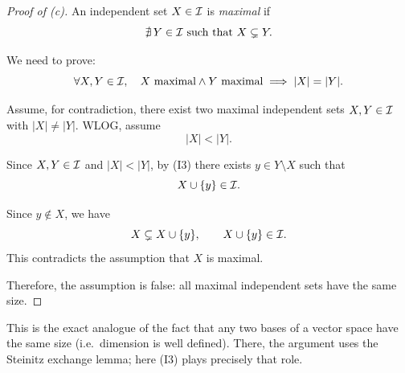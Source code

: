 \documentclass[11pt]{article}
\begin{document}
\begin{solution}[(c)]
\begin{proof}[Proof of (c)]
    An independent set $X\in\mathcal{I}$ is \emph{maximal} if
    \[
        \nexists\, Y\in\mathcal{I} \text{ such that } X\subsetneq Y.
    \]

    We need to prove:
    \[
        \forall X,Y\in\mathcal{I},\quad X \text{ maximal} \wedge Y \text{
        maximal} \implies |X|=|Y|.
    \]

    Assume, for contradiction, there exist two maximal independent
    sets $X,Y\in\mathcal{I}$ with $|X|\ne|Y|$. WLOG, assume
    \[
        |X|<|Y|.
    \]

    Since $X,Y\in\mathcal{I}$ and $|X|<|Y|$, by (I3) there exists
    $y\in Y\setminus X$ such that
    \[
        X\cup\{y\}\in\mathcal{I}.
    \]

    Since $y\notin X$, we have
    \[
        X\subsetneq X\cup\{y\}, \qquad X\cup\{y\}\in\mathcal{I}.
    \]
    This contradicts the assumption that $X$ is maximal.

    Therefore, the assumption is false: all maximal independent sets
    have the same size.
\end{proof}

\begin{remark}
    This is the exact analogue of the fact that any two bases of a
    vector space have the same size (i.e.\ dimension is well
    defined). There, the argument uses the Steinitz exchange lemma;
    here (I3) plays precisely that role.
\end{remark}
\end{solution}

\begin{solution}[(d)]
\end{solution}
\end{document}
